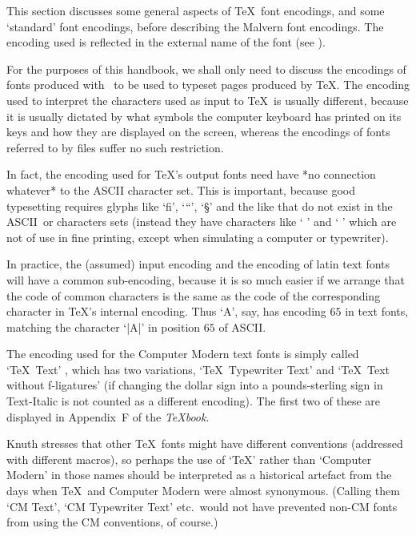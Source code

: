 	This section discusses some general aspects of \TeX\ font
	encodings, and some `standard' font encodings, before describing
	the Malvern font encodings.  The encoding used is reflected in
	the external name of the font (see ).

\iflong


	For the purposes of this handbook, we shall only need to discuss
	the encodings of fonts produced with \MF\ to be used to typeset
	pages produced by \TeX.  The encoding used to interpret the
	characters used as input to \TeX\ is usually different, because
	it is usually dictated by what symbols the computer keyboard has
	printed on its keys and how they are displayed on the screen,
	whereas the encodings of fonts referred to by  files
	suffer no such restriction.  

	In fact, the encoding used for \TeX's output fonts need have *no
	connection whatever* to the ASCII character set.  This is
	important, because good typesetting requires glyphs like `fi',
	`\thinspace``\thinspace', `\S{}' and the like that do not exist
	in the ASCII\ or  characters sets (instead they have
	characters like `{\rmb{} }' and `{\rmb{} }' which are
	not of use in fine printing, except when simulating a computer
	or typewriter).

	In practice, the (assumed) input encoding and the encoding of
	latin text fonts will have a common sub-encoding, because it is
	so much easier if we arrange that the code of common characters
	is the same as the code of the corresponding character in \TeX's
	internal encoding.  Thus `A', say, has encoding $65$ in text
	fonts, matching the character `|A|' in position $65$ of ASCII.



	The encoding used for the Computer Modern text fonts is simply
	called `\TeX\ Text' \cite{MFApp.F}, which has two
	variations, `\TeX\ Typewriter Text' and `\TeX\ Text without
	f-ligatures' (if changing the dollar sign into a pounds-sterling
	sign in  Text-Italic is not counted as a different
	encoding).  The first two of these are displayed in Appendix~F of
	the {\it\TeX book}.  

	Knuth stresses that other \TeX\ fonts might have different
	conventions (addressed with different macros), so perhaps the
	use of `\TeX' rather than `Computer Modern' in those names
	should be interpreted as a historical artefact from the days
	when \TeX\ and Computer Modern were almost synonymous.  (Calling
	them `CM Text', `CM Typewriter Text' etc.~would not have
	prevented non-CM fonts from using the CM conventions, of
	course.)

